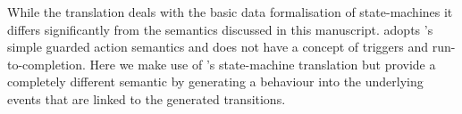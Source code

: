 While the \UMLB translation deals with the basic data formalisation of
state-machines it differs significantly from the semantics discussed
in this manuscript.  \UMLB adopts \EventB's simple guarded action
semantics and does not have a concept of triggers and
run-to-completion.  Here we make use of \UMLB's state-machine
translation but provide a completely different semantic by generating
a behaviour into the underlying \EventB events that are linked to the
generated \UMLB transitions.
